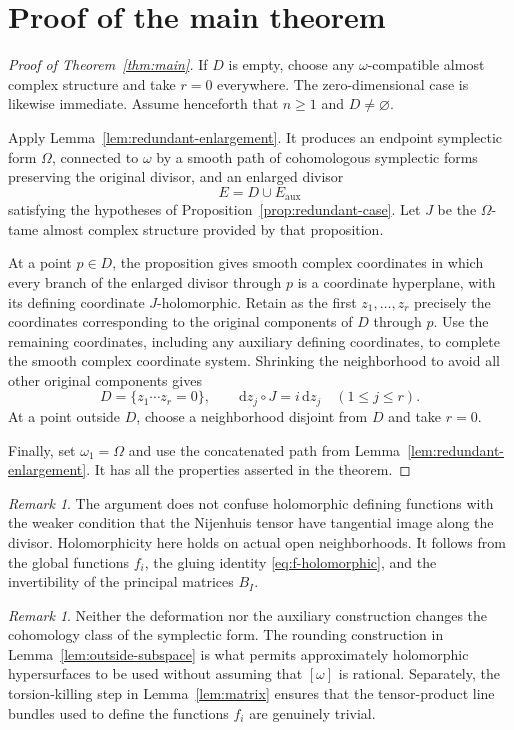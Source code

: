 \documentclass[11pt]{amsart}
\theoremstyle{definition}
\theoremstyle{remark}
\newtheorem{remark}[theorem]{Remark}
\newcommand{\dd}{\mathrm d}
\begin{document}
\section{Proof of the main theorem}

\begin{proof}[Proof of Theorem~\ref{thm:main}]
If $D$ is empty, choose any $\omega$-compatible almost complex
structure and take $r=0$ everywhere.  The zero-dimensional
case is likewise immediate.  Assume henceforth that $n\geq1$
and $D\neq\varnothing$.

Apply Lemma~\ref{lem:redundant-enlargement}.  It produces an
endpoint symplectic form $\Omega$, connected to $\omega$ by a
smooth path of cohomologous symplectic forms preserving the
original divisor, and an enlarged divisor
\[
E=D\cup E_{\mathrm{aux}}
\]
satisfying the hypotheses of
Proposition~\ref{prop:redundant-case}.  Let $J$ be the
$\Omega$-tame almost complex structure provided by that
proposition.

At a point $p\in D$, the proposition gives smooth complex
coordinates in which every branch of the enlarged divisor
through $p$ is a coordinate hyperplane, with its defining
coordinate $J$-holomorphic.  Retain as the first
$z_1,\ldots,z_r$ precisely the coordinates corresponding to
the original components of $D$ through $p$.  Use the remaining
coordinates, including any auxiliary defining coordinates, to
complete the smooth complex coordinate system.  Shrinking
the neighborhood to avoid all other original components gives
\[
D=\{z_1\cdots z_r=0\},\qquad
\dd z_j\circ J=i\,\dd z_j\quad(1\leq j\leq r).
\]
At a point outside $D$, choose a neighborhood disjoint from
$D$ and take $r=0$.

Finally, set $\omega_1=\Omega$ and use the concatenated path
from Lemma~\ref{lem:redundant-enlargement}.  It has all the
properties asserted in the theorem.
\end{proof}

\begin{remark}
The argument does not confuse holomorphic defining functions
with the weaker condition that the Nijenhuis tensor have
tangential image along the divisor.  Holomorphicity here holds
on actual open neighborhoods.  It follows from the global
functions $f_i$, the gluing identity
\eqref{eq:f-holomorphic}, and the invertibility of the principal
matrices $B_I$.
\end{remark}

\begin{remark}
Neither the deformation nor the auxiliary construction changes
the cohomology class of the symplectic form.  The rounding
construction in Lemma~\ref{lem:outside-subspace} is what permits
approximately holomorphic hypersurfaces to be used without
assuming that $[\omega]$ is rational.  Separately, the
torsion-killing step in Lemma~\ref{lem:matrix} ensures that the
tensor-product line bundles used to define the functions
$f_i$ are genuinely trivial.
\end{remark}
\end{document}
